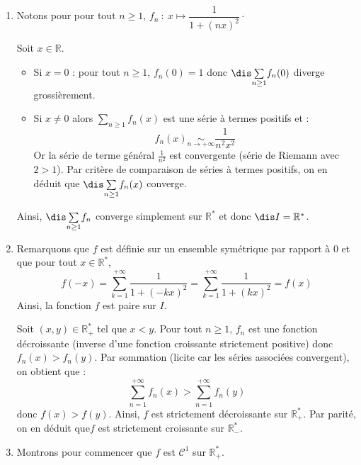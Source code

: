 \documentclass[a4paper,10pt]{report}
\newcommand{\Sum}[2]{\ensuremath{\textstyle{\sum\limits_{#1}^{#2}}}}
\begin{document}
\corr \begin{enumerate}
\item  Notons pour pour tout $n \geq 1$, $f_n\ :\ x\mapsto \dfrac{1}{1+(nx)^2} \cdot$

\medskip

\noindent Soit $x \in \mathbb{R}$.

\begin{itemize}
\item Si $x=0$ : pour tout $n \geq 1$, $f_n(0)=1$ donc $\dis \Sum{n \geq 1}{} f_n(0)$ diverge grossièrement.
\item Si $x \neq 0$ alors $\Sum{n \geq 1}{} f_n(x)$ est une série à termes positifs et :
$$ f_n(x) \underset{n \rightarrow + \infty}{\sim} \frac{1}{n^2x^2}$$
Or la série de terme général $\frac{1}{n^2}$ est convergente (série de Riemann avec $2>1$). Par critère de comparaison de séries à termes positifs, on en déduit que $\dis \Sum{n \geq 1}{} f_n(x)$ converge.
\end{itemize}
Ainsi, $\dis \Sum{n \geq 1}{} f_n$ converge simplement sur $\mathbb{R}^*$ et donc $\dis I = \mathbb{R}^*$.

\item Remarquons que $f$ est définie sur un ensemble symétrique par rapport à $0$ et que pour tout $x \in \mathbb{R}^*$,
$$ f(-x) = \sum_{k=1}^{+ \infty} \frac{1}{1+(-kx)^2} = \sum_{k=1}^{+ \infty} \frac{1}{1+(kx)^2} = f(x)$$
Ainsi, la fonction $f$ est paire sur $I$.

\medskip

\noindent Soit $(x,y) \in \mathbb{R}_+^{*}$ tel que $x<y$. Pour tout $n \geq 1$, $f_n$ est une fonction décroissante (inverse d'une fonction croissante strictement positive) donc $f_n(x)>f_n(y)$. Par sommation (licite car les séries associées convergent), on obtient que :
$$ \sum_{n=1}^{+ \infty} f_n(x) >  \sum_{n=1}^{+ \infty} f_n(y)$$
donc $f(x) > f(y)$. Ainsi, $f$ est strictement décroissante sur $\mathbb{R}_+^{*}$.
Par parité, on en déduit que$f$ est strictement croissante sur $\mathbb{R}_{-}^{*}$.
\item Montrons pour commencer que $f$ est $\mathcal{C}^1$ sur $\mathbb{R}_+^{*}$.


\end{enumerate}
\end{document}
